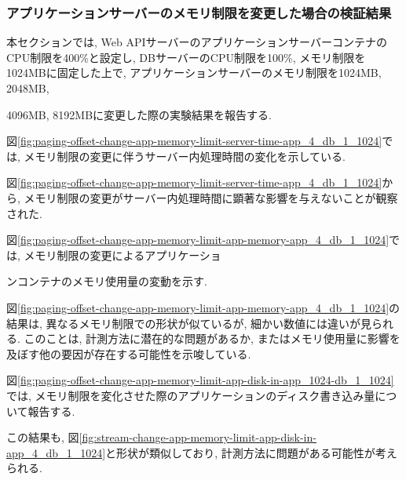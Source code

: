 \documentclass[../../../../main]{subfiles}
\begin{document}
    \subsubsection{アプリケーションサーバーのメモリ制限を変更した場合の検証結果}\label{subsubsec:result-paging-offset-change-app-memory}

    本セクションでは, Web APIサーバーのアプリケーションサーバーコンテナのCPU制限を400\%と設定し, DBサーバーのCPU制限を100\%, メモリ制限を1024MBに固定した上で, アプリケーションサーバーのメモリ制限を1024MB, 2048MB,

    4096MB, 8192MBに変更した際の実験結果を報告する.


    図\ref{fig:paging-offset-change-app-memory-limit-server-time-app_4_db_1_1024}では, メモリ制限の変更に伴うサーバー内処理時間の変化を示している.

    

    図\ref{fig:paging-offset-change-app-memory-limit-server-time-app_4_db_1_1024}から, メモリ制限の変更がサーバー内処理時間に顕著な影響を与えないことが観察された.


    図\ref{fig:paging-offset-change-app-memory-limit-app-memory-app_4_db_1_1024}では, メモリ制限の変更によるアプリケーショ

    ンコンテナのメモリ使用量の変動を示す.

    

    図\ref{fig:paging-offset-change-app-memory-limit-app-memory-app_4_db_1_1024}の結果は, 異なるメモリ制限での形状が似ているが, 細かい数値には違いが見られる. このことは, 計測方法に潜在的な問題があるか, またはメモリ使用量に影響を及ぼす他の要因が存在する可能性を示唆している.


    図\ref{fig:paging-offset-change-app-memory-limit-app-disk-in-app_1024-db_1_1024}では, メモリ制限を変化させた際のアプリケーションのディスク書き込み量について報告する.

    

    この結果も, 図\ref{fig:stream-change-app-memory-limit-app-disk-in-app_4_db_1_1024}と形状が類似しており, 計測方法に問題がある可能性が考えられる.
\end{document}
